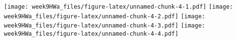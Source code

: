 \documentclass[
]{article}
\begin{document}
\texttt{[image: week9HWa\_files/figure-latex/unnamed-chunk-4-1.pdf]}
\texttt{[image: week9HWa\_files/figure-latex/unnamed-chunk-4-2.pdf]}
\texttt{[image: week9HWa\_files/figure-latex/unnamed-chunk-4-3.pdf]}
\texttt{[image: week9HWa\_files/figure-latex/unnamed-chunk-4-4.pdf]}
\end{document}
